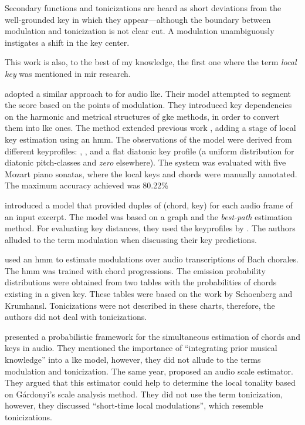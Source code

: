 \begin{italicsquote}
    Secondary functions and tonicizations are heard as short
    deviations from the well-grounded key in which they
    appear---although the boundary between modulation and
    tonicization is not clear cut. A modulation
    unambiguously instigates a shift in the key center.
\end{italicsquote}

This work is also, to the best of my knowledge, the first
one where the term \emph{local key} was mentioned in
\gls{mir} research.

\textcite{papadopoulos2009local} adopted a similar approach
to \textcite{izmirli2007localized} for audio \gls{lke}.
Their model attempted to segment the score based on the
points of modulation. They introduced key dependencies on
the harmonic and metrical structures of \gls{gke} methods,
in order to convert them into \gls{lke} ones. The method
extended previous work
\parencite{papadopoulos2008simultaneous}, adding a stage of
local key estimation using an \gls{hmm}. The observations of
the model were derived from different \gls{keyprofile}s:
\textcite{krumhansl1982tracing},
\textcite{temperley1999whats}, and a flat diatonic key
profile (a uniform distribution for diatonic pitch-classes
and \emph{zero} elsewhere). The system was evaluated with
five Mozart piano sonatas, where the local keys and chords
were manually annotated. The maximum accuracy achieved was
80.22\%

\textcite{rocher2010concurrent} introduced a model that
provided duples of (chord, key) for each audio frame of an
input excerpt. The model was based on a graph and the
\emph{best-path} estimation method. For evaluating key
distances, they used the \gls{keyprofile}s by
\textcite{temperley1999whats}. The authors alluded to the
term modulation when discussing their key predictions.

\textcite{mearns2011automatically} used an \gls{hmm} to
estimate modulations over audio transcriptions of Bach
chorales. The \gls{hmm} was trained with chord progressions.
The emission probability distributions were obtained from
two tables with the probabilities of chords existing in a
given key. These tables were based on the work by Schoenberg
and Krumhansl. Tonicizations were not described in these
charts, therefore, the authors did not deal with
tonicizations.


\textcite{pauwels2014combining} presented a probabilistic
framework for the simultaneous estimation of chords and keys
in audio. They mentioned the importance of ``integrating
prior musical knowledge'' into a \gls{lke} model, however,
they did not allude to the terms modulation and
tonicization. The same year, \textcite{weis2014chromabased}
proposed an audio scale estimator. They argued that this
estimator could help to determine the local tonality based
on G\'{a}rdonyi's scale analysis method. They did not use
the term tonicization, however, they discussed ``short-time
local modulations'', which resemble tonicizations.

